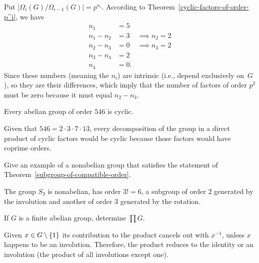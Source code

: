 \begin{solution} Put $|\Omega_i(G)/\Omega_{i-1}(G)|=p^{n_i}$. According to Theorem~\ref{cyclic-factors-of-order-p^i}, we have
\begin{align*}
    n_1 &= 5\\
    n_1 - n_2 &= 3  &\implies n_2=2\\
    n_2 - n_3 &= 0  &\implies n_3=2\\
    n_3 - n_4 &= 2\\
    n_4 &= 0.
\end{align*}
Since these numbers (meaning the $n_i$) are intrinsic (i.e., depend exclusively on~$G$), so they are their differences, which imply that the number of factors of order $p^2$ must be zero because it must equal $n_2-n_3$.  \end{solution}

\begin{exr}
    Every abelian group of order\/ $546$ is cyclic.
\end{exr}

\begin{solution} Given that $546=2\cdot3\cdot7\cdot13$, every decomposition of the group in a direct product of cyclic factors would be cyclic because those factors would have coprime orders.  \end{solution}

\begin{exr}
    Give an example of a nonabelian group that satisfies the statement of\/ \textrm{\upshape Theorem~\ref{subgroup-of-compatible-order}}.
\end{exr}

\begin{solution} The group $S_3$ is nonabelian, has order $3!=6$, a subgroup of order $2$ generated by the involution and another of order $3$ generated by the rotation.  \end{solution}

\begin{exr}\label{exercise-2.1.6}
    If $G$ is a finite abelian group, determine $\prod G$.
\end{exr}

\begin{solution} Given $x\in G\setminus\{1\}$ its contribution to the product cancels out with $x^{-1}$, unless $x$ happens to be an involution. Therefore, the product reduces to the identity or an involution (the product of all involutions except one).  \end{solution}

